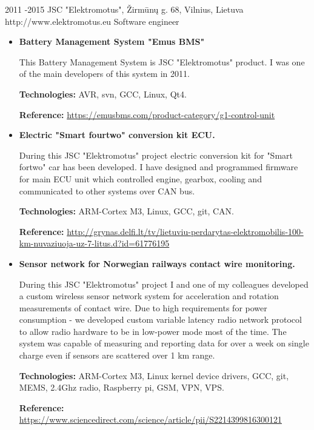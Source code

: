\documentclass[12]{article}
\begin{document}
\job
{2011 -}{2015}
{JSC "Elektromotus", Žirmūnų g. 68, Vilnius, Lietuva}
{http://www.elektromotus.eu}
{Software engineer}
{}
\begin{itemize}[leftmargin=2cm,topsep=-0.5cm]

\item \textbf{Battery Management System "Emus BMS"}

This Battery Management System is JSC "Elektromotus" product.
I was one of the main developers of this system in 2011.

\rule{0mm}{5mm}\textbf{Technologies:} AVR, svn, GCC, Linux, Qt4.

\rule{0mm}{5mm}\textbf{Reference:} \url{https://emusbms.com/product-category/g1-control-unit}

\item \textbf{Electric "Smart fourtwo" conversion kit ECU.}

During this JSC "Elektromotus" project electric conversion kit for "Smart fortwo" car has been developed.
I have designed and programmed firmware for main ECU unit which controlled engine, gearbox, cooling and communicated to other systems over CAN bus.

\rule{0mm}{5mm}\textbf{Technologies:} ARM-Cortex M3, Linux, GCC, git, CAN.

\rule{0mm}{5mm}\textbf{Reference:} \url{http://grynas.delfi.lt/tv/lietuviu-perdarytas-elektromobilis-100-km-nuvaziuoja-uz-7-litus.d?id=61776195}

\item \textbf{Sensor network for Norwegian railways contact wire monitoring.}

During this JSC "Elektromotus" project I and one of my colleagues developed a custom wireless sensor network system for acceleration and rotation measurements of contact wire.
Due to high requirements for power consumption - we developed custom variable latency radio network protocol to allow radio hardware to be in low-power mode most of the time.
The system was capable of measuring and reporting data for over a week on single charge even if sensors are scattered over 1 km range.

\rule{0mm}{5mm}\textbf{Technologies:} ARM-Cortex M3, Linux kernel device drivers, GCC, git, MEMS, 2.4Ghz radio, Raspberry pi, GSM, VPN, VPS.

\rule{0mm}{5mm}\textbf{Reference:} \url{https://www.sciencedirect.com/science/article/pii/S2214399816300121}

\end{itemize}
\end{document}
